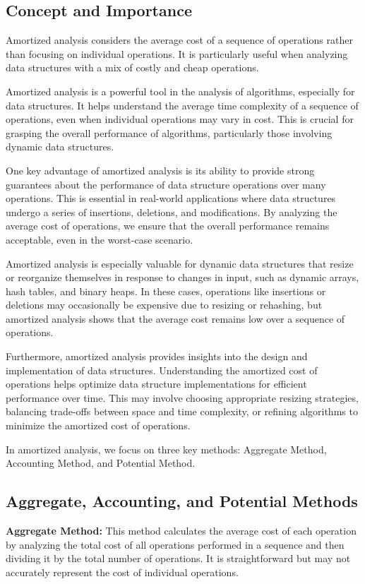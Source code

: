 \documentclass[12pt]{book} %
\begin{document}
\subsection{Concept and Importance}
Amortized analysis considers the average cost of a sequence of operations rather than focusing on individual operations. It is particularly useful when analyzing data structures with a mix of costly and cheap operations. 

Amortized analysis is a powerful tool in the analysis of algorithms, especially for data structures. It helps understand the average time complexity of a sequence of operations, even when individual operations may vary in cost. This is crucial for grasping the overall performance of algorithms, particularly those involving dynamic data structures.

One key advantage of amortized analysis is its ability to provide strong guarantees about the performance of data structure operations over many operations. This is essential in real-world applications where data structures undergo a series of insertions, deletions, and modifications. By analyzing the average cost of operations, we ensure that the overall performance remains acceptable, even in the worst-case scenario.

Amortized analysis is especially valuable for dynamic data structures that resize or reorganize themselves in response to changes in input, such as dynamic arrays, hash tables, and binary heaps. In these cases, operations like insertions or deletions may occasionally be expensive due to resizing or rehashing, but amortized analysis shows that the average cost remains low over a sequence of operations.

Furthermore, amortized analysis provides insights into the design and implementation of data structures. Understanding the amortized cost of operations helps optimize data structure implementations for efficient performance over time. This may involve choosing appropriate resizing strategies, balancing trade-offs between space and time complexity, or refining algorithms to minimize the amortized cost of operations.

In amortized analysis, we focus on three key methods: Aggregate Method, Accounting Method, and Potential Method.

\subsection{Aggregate, Accounting, and Potential Methods}
\textbf{Aggregate Method:} This method calculates the average cost of each operation by analyzing the total cost of all operations performed in a sequence and then dividing it by the total number of operations. It is straightforward but may not accurately represent the cost of individual operations.
\end{document}
